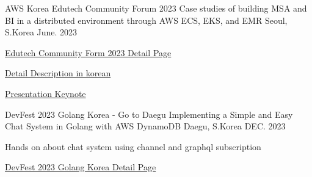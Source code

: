 

\begin{cventries}

  \cventry
    {AWS Korea Edutech Community Forum 2023} %
    {Case studies of building MSA and BI in a distributed environment through AWS ECS, EKS, and EMR} %
    {Seoul, S.Korea} %
    {June. 2023} %
    {
      \begin{cvitems} %
        \item {\href{https://pages.awscloud.com/edutech-community-forum-2023.html}{Edutech Community Form 2023 Detail Page}}
        \item {\href{https://www.linkedin.com/feed/update/urn:li:activity:7082573017570021376/}{Detail Description in korean}}
        \item {\href{https://www.slideshare.net/JQLEE6/aws-korea-edutech-community-forum-2023-pdf}{Presentation Keynote}}
      \end{cvitems}
    }

  \cventry
    {DevFest 2023 Golang Korea - Go to Daegu} %
    {Implementing a Simple and Easy Chat System in Golang with AWS DynamoDB} %
    {Daegu, S.Korea} %
    {DEC. 2023} %
    {
      \begin{cvitems} %
        \item {Hands on about chat system using channel and graphql subscription}
        \item {\href{https://festa.io/events/4339}{DevFest 2023 Golang Korea Detail Page}}
      \end{cvitems}
    }

\end{cventries}
